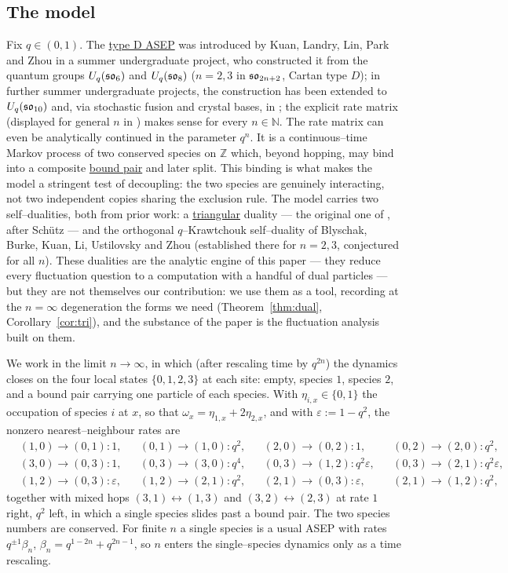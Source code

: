 \documentclass[11pt]{article}
\theoremstyle{plain}
\theoremstyle{definition}
\theoremstyle{remark}
\newcommand{\Z}{\mathbb{Z}}\newcommand{\R}{\mathbb{R}}\newcommand{\N}{\mathbb{N}}
\newcommand{\eps}{\varepsilon}\newcommand{\Exp}{\mathrm{Exp}}
\begin{document}
\subsection{The model}\label{sec:intromodel}
Fix $q\in(0,1)$. The \underline{type D ASEP} was introduced by Kuan, Landry, Lin, Park and
Zhou \cite{KLLPZ} in a summer undergraduate project, who constructed it from the quantum groups $U_q(\mathfrak{so}_6)$ and
$U_q(\mathfrak{so}_8)$ ($n=2,3$ in $\mathfrak{so}_{2n+2}$, Cartan type $D$); in further summer undergraduate projects, the construction has been extended to $U_q(\mathfrak{so}_{10})$ \cite{RSL} and, via stochastic fusion and crystal bases, in
\cite{BEPS}; the explicit rate matrix (displayed for general $n$ in \cite[\S2.1]{REU})
makes sense for every $n\in\N$. The rate matrix can even be analytically continued in the parameter $q^n$. It is a continuous--time Markov process of two conserved species on $\Z$ which, beyond
hopping, may bind into a composite \underline{bound pair} and later split. This binding is
what makes the model a stringent test of decoupling: the two species are genuinely
interacting, not two independent copies sharing the exclusion rule. The model carries
two self--dualities, both from prior work: a \underline{triangular} duality --- the
original one of \cite{KLLPZ}, after Sch\"utz \cite{SchutzDual} --- and the orthogonal
$q$--Krawtchouk self--duality of Blyschak, Burke, Kuan, Li, Ustilovsky and Zhou
\cite{REU} (established there for $n=2,3$, conjectured for all $n$). These dualities
are the analytic engine of this paper --- they reduce every fluctuation question to a
computation with a handful of dual particles --- but they are not themselves our
contribution: we use them as a tool, recording at the $n=\infty$ degeneration the
forms we need (Theorem~\ref{thm:dual}, Corollary~\ref{cor:tri}), and the substance of
the paper is the fluctuation analysis built on them.

We work in the limit $n\to\infty$, in which (after rescaling time by $q^{2n}$) the
dynamics closes on the four local states $\{0,1,2,3\}$ at each site: empty, species
$1$, species $2$, and a bound pair carrying one particle of each species. With
$\eta_{i,x}\in\{0,1\}$ the occupation of species $i$ at $x$, so that
$\omega_x=\eta_{1,x}+2\eta_{2,x}$, and with $\eps:=1-q^2$, the nonzero
nearest--neighbour rates are
\begin{equation}\label{eq:rates}
\begin{aligned}
&(1,0)\!\to\!(0,1):1, &&(0,1)\!\to\!(1,0):q^2, &&(2,0)\!\to\!(0,2):1, &&(0,2)\!\to\!(2,0):q^2,\\
&(3,0)\!\to\!(0,3):1, &&(0,3)\!\to\!(3,0):q^4, &&(0,3)\!\to\!(1,2):q^2\eps, &&(0,3)\!\to\!(2,1):q^2\eps,\\
&(1,2)\!\to\!(0,3):\eps, &&(1,2)\!\to\!(2,1):q^2, &&(2,1)\!\to\!(0,3):\eps, &&(2,1)\!\to\!(1,2):q^2,
\end{aligned}
\end{equation}
together with mixed hops $(3,1)\!\leftrightarrow\!(1,3)$ and
$(3,2)\!\leftrightarrow\!(2,3)$ at rate $1$ right, $q^2$ left, in which a single
species slides past a bound pair. The two species numbers are conserved. For finite
$n$ a single species is a usual ASEP with rates $q^{\pm1}\beta_n$,
$\beta_n=q^{1-2n}+q^{2n-1}$, so $n$ enters the single--species dynamics only as a time
rescaling.
\end{document}
